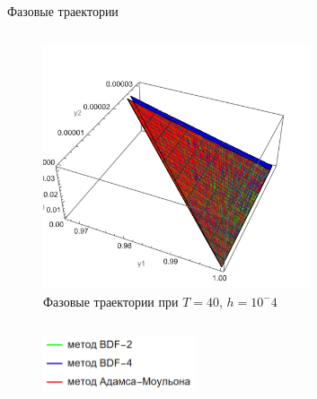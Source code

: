 \documentclass[ignoreonframetext,unicode]{beamer}
\begin{document}
\begin{frame}{Фазовые траектории}
\begin{columns}
	\begin{figure}[!htbp]
		\centering
		\includegraphics[width=0.7\textwidth]{T-40-s1000-0}%
		\caption{Фазовые траектории при $T = 40$, $h = 10^-4$}
		\vspace*{-2mm}
		\label{T-40-s1000-0}
	\end{figure}
	\end{columns}

	\begin{figure}[!htbp]
		\centering
		\includegraphics[width=0.4\textwidth]{graph-legend}%
	\end{figure}
\end{frame}
\end{document}
